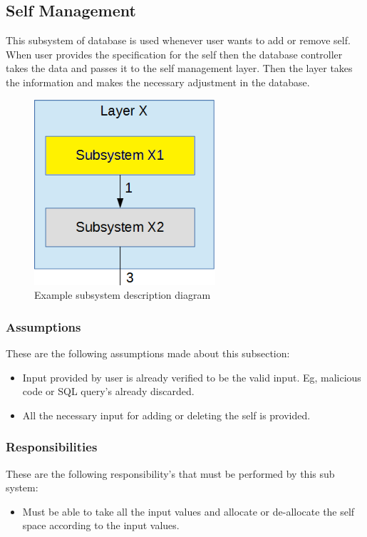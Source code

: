 \subsection{Self Management}
This subsystem of database is used whenever user wants to add or remove self. When user provides the specification for the self then the database controller takes the data and passes it to the self management layer. Then the layer takes the information and makes the necessary adjustment in the database.
\begin{figure}[h!]
	\centering
 	\includegraphics[width=0.60\textwidth]{images/subsystem}
 \caption{Example subsystem description diagram}
\end{figure}

\subsubsection{Assumptions}
These are the following assumptions made about this subsection:
\begin{itemize}
    \item Input provided by user is already verified to be the valid input. Eg, malicious code or SQL query's already discarded.
    \item All the necessary input for adding or deleting the self is provided.
\end{itemize}

\subsubsection{Responsibilities}
These are the following responsibility's that must be performed by this sub system:
\begin{itemize}
    \item Must be able to take all the input values and allocate or de-allocate the self space according to the input values.
\end{itemize}

